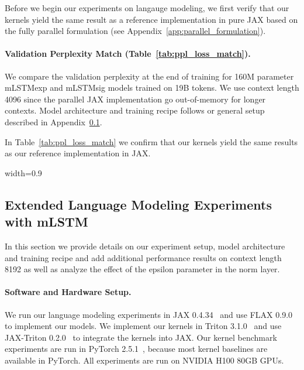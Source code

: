 \documentclass{article}
\begin{document}
    Before we begin our experiments on langauge modeling, we first verify that our kernels yield the same result as a reference implementation in pure JAX based on the fully parallel formulation (see Appendix~\ref{app:parallel_formulation}).

    \paragraph{Validation Perplexity Match (Table~\ref{tab:ppl_loss_match}).}
    We compare the validation perplexity at the end of training for 160M parameter mLSTMexp and mLSTMsig models trained on 19B tokens.
    We use context length 4096 since the parallel JAX implementation go out-of-memory for longer contexts.
    Model architecture and training recipe follows or general setup described in Appendix~\ref{app:extended_language_modeling_mlstm}.

    In Table~\ref{tab:ppl_loss_match} we confirm that our kernels yield the same results as our reference implementation in JAX.
    \begin{table}[htbp]
        \centering
        \caption{Validation Perplexity for 160M parameter models at context length 4096 trained on 19B tokens.}
        \vspace{0.2cm}
            \begin{adjustbox}{width=0.9\textwidth}
                
            \end{adjustbox}
        \label{tab:ppl_loss_match}
    \end{table}
    \subsection{Extended Language Modeling Experiments with mLSTM}
    \label{app:extended_language_modeling_mlstm}

    In this section we provide details on our experiment setup, model architecture and training recipe and add additional performance results on context length 8192 as well as analyze the effect of the epsilon parameter in the norm layer.

    \paragraph{Software and Hardware Setup.}
    We run our language modeling experiments in JAX 0.4.34~\citep{bradbury:18jax} and use FLAX 0.9.0~\citep{heek:20flax} to implement our models.
    We implement our kernels in Triton 3.1.0~\citep{tillet:19triton, tillet:20triton} and use JAX-Triton 0.2.0~\citep{vikram:20jaxtriton} to integrate the kernels into JAX.
    Our kernel benchmark experiments are run in PyTorch 2.5.1~\citep{paszke:19pytorch}, because most kernel baselines are available in PyTorch.
    All experiments are run on NVIDIA H100 80GB GPUs.
\end{document}

